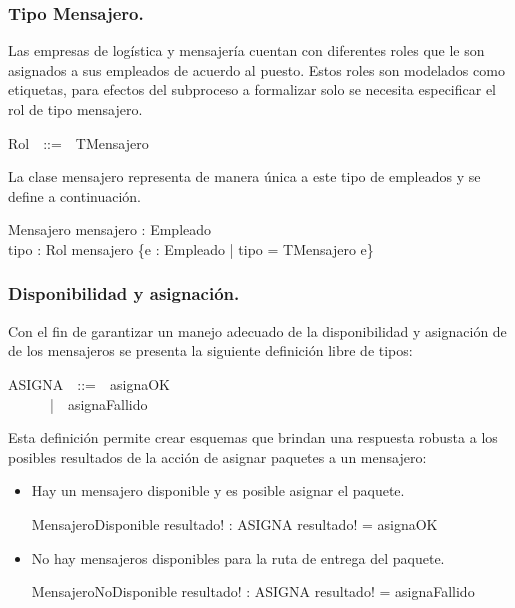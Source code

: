 \documentclass[12pt,a4paper]{article}
\begin{document}
\subsubsection{Tipo Mensajero.}
Las empresas de logística y mensajería cuentan con diferentes roles que le son asignados a sus empleados de acuerdo al puesto. Estos roles son modelados como etiquetas, para efectos del subproceso a formalizar solo se necesita especificar el rol de tipo mensajero.

\begin{zed}
Rol~~::=~~TMensajero
\end{zed}

La clase mensajero representa de manera única a este tipo de empleados y se define a continuación.

\begin{schema}{Mensajero}
mensajero : Empleado\\
tipo : Rol
\where
mensajero \in \{e : Empleado | tipo = TMensajero \spot e\}
\end{schema}

\subsubsection{Disponibilidad y asignación.}
Con el fin de garantizar un manejo adecuado de la disponibilidad y asignación de de los mensajeros se presenta la siguiente definición libre de tipos:

\begin{zed}
ASIGNA~~::=~~asignaOK\\
~~~~~~|~~asignaFallido
\end{zed}

Esta definición permite crear esquemas que brindan una respuesta robusta a los posibles resultados de la acción de asignar paquetes a un mensajero:
\begin{itemize}
\item Hay un mensajero disponible y es posible asignar el paquete.
\begin{schema}{MensajeroDisponible}
resultado! : ASIGNA
\where
resultado! = asignaOK
\end{schema}

\item No hay mensajeros disponibles para la ruta de entrega del paquete.
\begin{schema}{MensajeroNoDisponible}
resultado! : ASIGNA
\where
resultado! = asignaFallido
\end{schema}
\end{itemize} 
\end{document}
